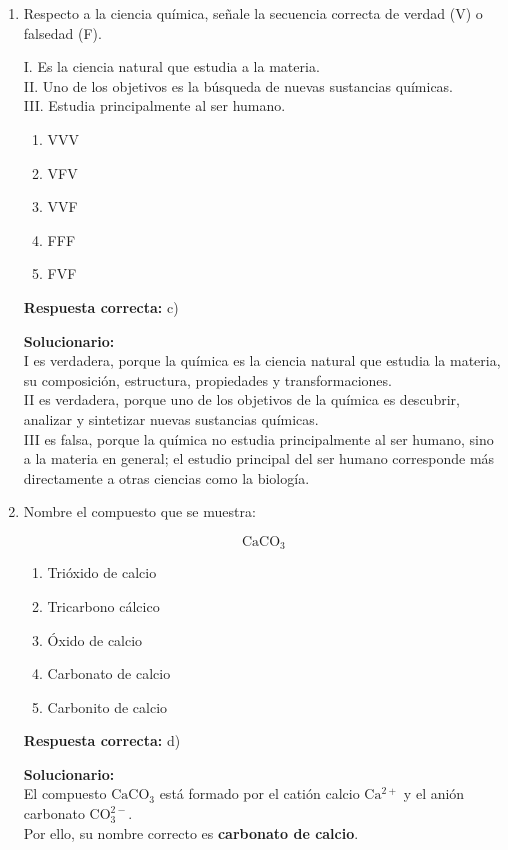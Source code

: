 \begin{enumerate}
	
	\item Respecto a la ciencia química, señale la secuencia correcta de verdad (V) o falsedad (F).
	
	I. Es la ciencia natural que estudia a la materia.\\
	II. Uno de los objetivos es la búsqueda de nuevas sustancias químicas.\\
	III. Estudia principalmente al ser humano.
	
	\begin{enumerate}[label=\alph*)]
		\item VVV
		\item VFV
		\item VVF
		\item FFF
		\item FVF
	\end{enumerate}
	\textbf{Respuesta correcta:} c)
	
	\vspace{2mm}
	\textbf{Solucionario:}\\
	I es verdadera, porque la química es la ciencia natural que estudia la materia, su composición, estructura, propiedades y transformaciones.\\
	II es verdadera, porque uno de los objetivos de la química es descubrir, analizar y sintetizar nuevas sustancias químicas.\\
	III es falsa, porque la química no estudia principalmente al ser humano, sino a la materia en general; el estudio principal del ser humano corresponde más directamente a otras ciencias como la biología.
	
	\vspace{6mm}
	
	\item Nombre el compuesto que se muestra:
	
	\[
	\mathrm{CaCO_3}
	\]
	
	\begin{enumerate}[label=\alph*)]
		\item Trióxido de calcio
		\item Tricarbono cálcico
		\item Óxido de calcio
		\item Carbonato de calcio
		\item Carbonito de calcio
	\end{enumerate}
	\textbf{Respuesta correcta:} d)
	
	\vspace{2mm}
	\textbf{Solucionario:}\\
	El compuesto \(\mathrm{CaCO_3}\) está formado por el catión calcio \(\mathrm{Ca^{2+}}\) y el anión carbonato \(\mathrm{CO_3^{2-}}\).\\
	Por ello, su nombre correcto es \textbf{carbonato de calcio}.
	
	\vspace{6mm}
	
\end{enumerate}







